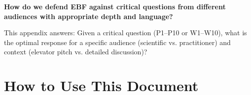 
\begin{tcolorbox}[colback=red!5!white, colframe=red!75!black,
    title=Fundamental Question]
\textbf{How do we defend EBF against critical questions from different audiences with appropriate depth and language?}

This appendix answers: Given a critical question (P1--P10 or W1--W10), what is the optimal response for a specific audience (scientific vs. practitioner) and context (elevator pitch vs. detailed discussion)?
\end{tcolorbox}


\begin{abstract}
This appendix provides ready-to-use responses for the 20 critical questions
identified in Appendix UNMAPPED_DA. Each question has 6 response variants: 3 lengths
(short/medium/long) $\times$ 2 audiences (scientific/practitioner). Use the
appropriate variant based on context, time available, and audience expertise.
All scientific (LANG) versions include proper citations to the behavioral economics
literature (Kahneman, Tversky, Fehr, Thaler, Camerer, et al.).
\end{abstract}

\section{How to Use This Document}
\label{sec:da2-howto}

